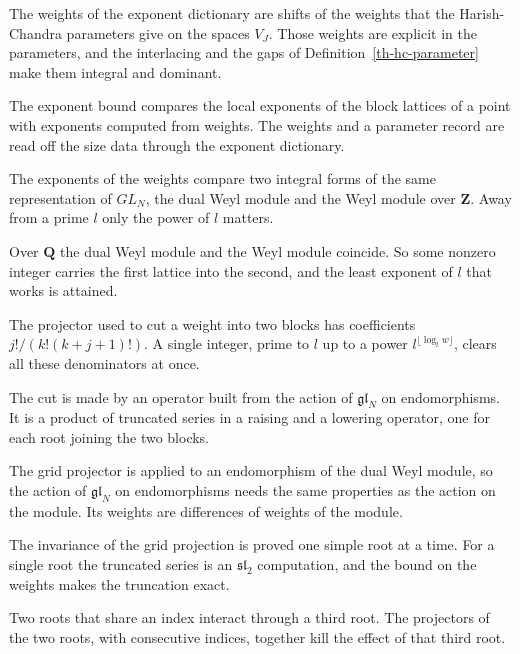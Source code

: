 The weights of the exponent dictionary are shifts of the weights that the Harish-Chandra parameters
give on the spaces $V_J$. Those weights are explicit in the parameters, and the interlacing and the
gaps of Definition~\ref{th-hc-parameter} make them integral and dominant.

The exponent bound compares the local exponents of the block lattices of a point with exponents
computed from weights. The weights and a parameter record are read off the size data through the exponent
dictionary.

The exponents of the weights compare two integral forms of the same representation of $GL_N$, the dual
Weyl module and the Weyl module over $\mathbf Z$. Away from a prime $l$ only the power of $l$ matters.

Over $\mathbf Q$ the dual Weyl module and the Weyl module coincide. So some nonzero integer carries the
first lattice into the second, and the least exponent of $l$ that works is attained.

The projector used to cut a weight into two blocks has coefficients $j!/(k!(k+j+1)!)$. A single integer,
prime to $l$ up to a power $l^{\lfloor\log_lw\rfloor}$, clears all these denominators at once.

The cut is made by an operator built from the action of $\mathfrak{gl}_N$ on endomorphisms. It is a
product of truncated series in a raising and a lowering operator, one for each root joining the two
blocks.

The grid projector is applied to an endomorphism of the dual Weyl module, so the action of
$\mathfrak{gl}_N$ on endomorphisms needs the same properties as the action on the module. Its weights
are differences of weights of the module.

The invariance of the grid projection is proved one simple root at a time. For a single root the
truncated series is an $\mathfrak{sl}_2$ computation, and the bound on the weights makes the truncation
exact.

Two roots that share an index interact through a third root. The projectors of the two roots, with
consecutive indices, together kill the effect of that third root.

